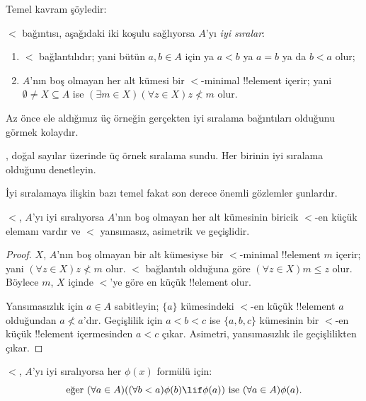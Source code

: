 \documentclass[../../../include/open-logic-section]{subfiles}
\begin{document}

Temel kavram şöyledir:

\begin{defn}
$<$ bağıntısı, aşağıdaki iki koşulu sağlıyorsa $A$'yı \emph{iyi sıralar}:
\begin{enumerate}
	\item $<$ bağlantılıdır; yani bütün $a,b\in A$ için ya $a<b$ ya $a=b$
	ya da $b<a$ olur;
	\item $A$'nın boş olmayan her alt kümesi bir $<$-minimal
	!!{element} içerir; yani $\emptyset\neq X\subseteq A$ ise
	$(\exists m\in X)(\forall z\in X)z\nless m$ olur.
\end{enumerate}
\end{defn}

Az önce ele aldığımız üç örneğin gerçekten iyi sıralama bağıntıları olduğunu
görmek kolaydır.

\begin{prob}
, doğal sayılar üzerinde üç örnek sıralama
sundu. Her birinin iyi sıralama olduğunu denetleyin.
\end{prob}

İyi sıralamaya ilişkin bazı temel fakat son derece önemli gözlemler şunlardır.

\begin{prop}
$<$, $A$'yı iyi sıralıyorsa $A$'nın boş olmayan her alt kümesinin biricik
$<$-en küçük elemanı vardır ve $<$ yansımasız, asimetrik ve geçişlidir.
\end{prop}

\begin{proof}
$X$, $A$'nın boş olmayan bir alt kümesiyse bir $<$-minimal !!{element}
$m$ içerir; yani $(\forall z\in X)z\nless m$ olur. $<$ bağlantılı olduğuna
göre $(\forall z\in X)m\leq z$ olur. Böylece $m$, $X$ içinde $<$'ye göre
en küçük !!{element} olur.

Yansımasızlık için $a\in A$ sabitleyin; $\{a\}$ kümesindeki $<$-en küçük
!!{element} $a$ olduğundan $a\nless a$'dır. Geçişlilik için $a<b<c$ ise
$\{a,b,c\}$ kümesinin bir $<$-en küçük !!{element} içermesinden $a<c$
çıkar. Asimetri, yansımasızlık ile geçişlilikten çıkar.
\end{proof}

\begin{prop}
$<$, $A$'yı iyi sıralıyorsa her $\phi(x)$ formülü için:
\[
	\text{eğer }(\forall a \in A)((\forall b < a)\phi(b) \lif
		\phi(a))\text{ ise }(\forall a \in A)\phi(a).
\]
\end{prop}
\end{document}

